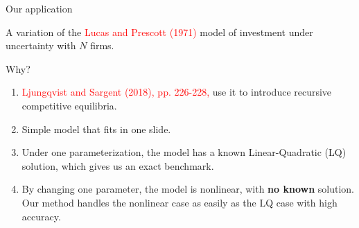 \documentclass[aspectratio=169,10pt]{beamer}
\newcommand{\emphcolor}[1]{\textbf{\textcolor{emphcolorval}{#1}}}
\begin{document}
		\begin{frame}{Our application}
		
			A variation of the \textcolor{red}{Lucas and Prescott (1971)} model of investment under uncertainty with $N$ firms.\vspace{0.1in}
		
			Why?\vspace{0.1in}
		
			\begin{enumerate}
		
				\item \textcolor{red}{Ljungqvist and Sargent (2018), pp. 226-228,} use it to introduce recursive competitive equilibria.\vspace{0.1in}
		
				\item Simple model that fits in one slide.\vspace{0.1in}
		
				\item Under one parameterization, the model has a known Linear-Quadratic (LQ) solution, which gives us an exact benchmark.\vspace{0.1in}
		
				\item By changing one parameter, the model is nonlinear, with \emphcolor{no known} solution. Our method handles the nonlinear case as easily as the LQ case  with high accuracy.
		
			\end{enumerate}
		\end{frame}
	
\end{document}
